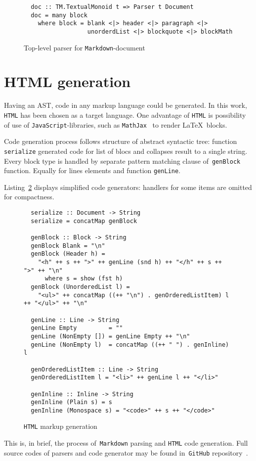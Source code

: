   \begin{figure}[h]
  \begin{lstlisting}
  doc :: TM.TextualMonoid t => Parser t Document
  doc = many block
    where block = blank <|> header <|> paragraph <|>
                  unorderdList <|> blockquote <|> blockMath
  \end{lstlisting}
  \caption{Top-level parser for \lstinline{Markdown}-document}
  \label{listing:MarkdownDoc}
  \end{figure}

\section{HTML generation}

  Having an AST, code in any markup language could be generated. In this work, 
  \lstinline{HTML} has been chosen as a target language. One advantage of \lstinline{HTML} 
  is possibility of use of \lstinline{JavaScript}-libraries,
  such as \lstinline{MathJax}~\cite{mathJax} to render \LaTeX~blocks. 

  Code generation process follows structure of abstract syntactic tree: function
  \lstinline{serialize} generated code for list of blocs and collapses result to
  a single string. Every block type is handled by separate pattern matching clause 
  of~\lstinline{genBlock} function. Equally for lines elements and function 
  \lstinline{genLine}.

  Listing~\ref{listing:HTMLGen} displays simplified code generators: handlers 
  for some items are omitted for compactness.  

  \begin{figure}[h]
  \begin{lstlisting}
  serialize :: Document -> String
  serialize = concatMap genBlock

  genBlock :: Block -> String
  genBlock Blank = "\n"
  genBlock (Header h) =
    "<h" ++ s ++ ">" ++ genLine (snd h) ++ "</h" ++ s ++ ">" ++ "\n"
      where s = show (fst h)
  genBlock (UnorderedList l) =
    "<ul>" ++ concatMap ((++ "\n") . genOrderedListItem) l ++ "</ul>" ++ "\n"

  genLine :: Line -> String
  genLine Empty         = ""
  genLine (NonEmpty []) = genLine Empty ++ "\n"
  genLine (NonEmpty l)  = concatMap ((++ " ") . genInline) l

  genOrderedListItem :: Line -> String
  genOrderedListItem l = "<li>" ++ genLine l ++ "</li>"

  genInline :: Inline -> String
  genInline (Plain s) = s
  genInline (Monospace s) = "<code>" ++ s ++ "</code>"
  \end{lstlisting}
  \caption{\lstinline{HTML} markup generation}
  \label{listing:HTMLGen}
  \end{figure}

  This is, in brief, the process of~\lstinline{Markdown} parsing and \lstinline{HTML}
  code generation. Full source codes of parsers and code generator may be found 
  in~\lstinline{GitHub} repository~\cite{mdParse}.
